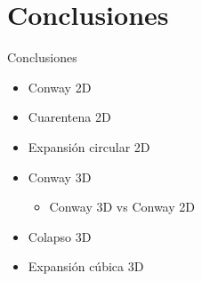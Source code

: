\section{Conclusiones}
\begin{frame}{Conclusiones}
    \begin{itemize}
        \item Conway 2D
        \item Cuarentena 2D
        \item Expansión circular 2D
        \item Conway 3D
        \begin{itemize}
            \item Conway 3D vs Conway 2D
        \end{itemize}
        \item Colapso 3D
        \item Expansión cúbica 3D
    \end{itemize}
\end{frame}
